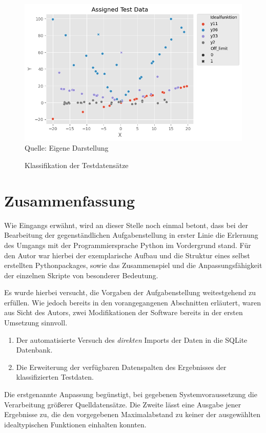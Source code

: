 \begin{figure}[h]
\centering
\caption{Klassifikation der Testdatensätze}
\includegraphics[width=13cm]{../output/figures/test.png}\\
Quelle: Eigene Darstellung
\label{fig:test}
\end{figure}


\chapter{Zusammenfassung}

Wie Eingangs erwähnt, wird an dieser Stelle noch einmal betont, dass bei der Bearbeitung der gegenständlichen Aufgabenstellung in erster Linie die Erlernung des Umgangs mit der Programmiersprache Python im Vordergrund stand. Für den Autor war hierbei der exemplarische Aufbau und die Struktur eines selbst erstellten Pythonpackages, sowie das Zusammenspiel und die Anpassungsfähigkeit der einzelnen Skripte von besonderer Bedeutung.

Es wurde hierbei versucht, die Vorgaben der Aufgabenstellung weitestgehend zu erfüllen. Wie jedoch bereits in den vorangegangenen Abschnitten erläutert, waren aus Sicht des Autors, zwei Modifikationen der Software bereits in der ersten Umsetzung sinnvoll.
\begin{enumerate}
 \itemsep0pt
 \item  Der automatisierte Versuch des \emph{direkten} Imports der Daten in die SQLite Datenbank.
 \item  Die Erweiterung der verfügbaren Datenspalten des Ergebnisses der klassifizierten Testdaten.
\end{enumerate}
Die erstgenannte Anpassung begünstigt, bei gegebenen Systemvoraussetzung die Verarbeitung größerer Quelldatensätze.
Die Zweite lässt eine Ausgabe jener Ergebnisse zu, die den vorgegebenen Maximalabstand zu keiner der ausgewählten idealtypischen Funktionen einhalten konnten.

